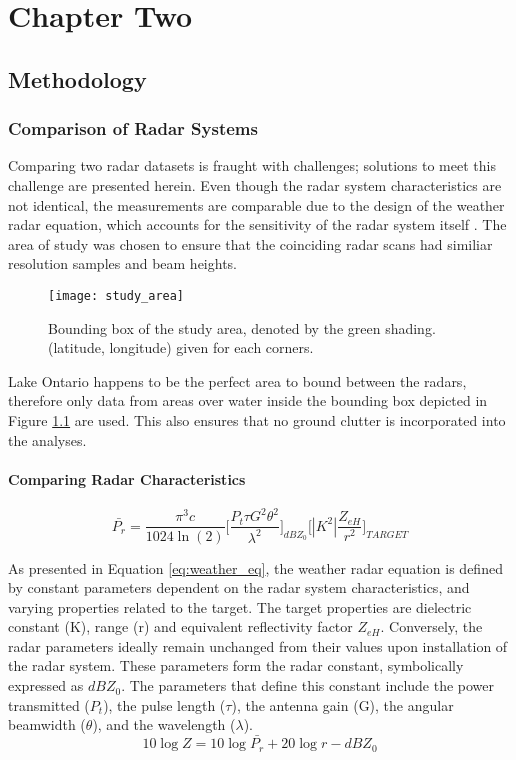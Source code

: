 \chapter{Chapter Two}
\section{Methodology}
\subsection{Comparison of Radar Systems}
Comparing two radar datasets is fraught with challenges; solutions to meet this challenge are presented herein. Even though the radar system characteristics are not identical, the measurements are comparable due to the design of the weather radar equation, which accounts for the sensitivity of the radar system itself \citep{Rogers1989}. The area of study was chosen to ensure that the coinciding radar scans had similiar resolution samples and beam heights. 
\begin{figure}[h]
\texttt{[image: study\_area]}\centering
\caption{Bounding box of the study area, denoted by the green shading. (latitude, longitude) given for each corners.} 
\label{fig:study_area}
\end{figure}
Lake Ontario happens to be the perfect area to bound between the radars, therefore only data from areas over water inside the bounding box depicted in Figure \ref{fig:study_area} are used. This also ensures that no ground clutter is incorporated into the analyses.
\subsubsection{Comparing Radar Characteristics}



\begin{equation}\label{eq:weather_eq}
\bar{P_r} = \frac{\pi^3c}{1024 \ln(2)} \Bigg[\frac{P_t \tau G^2 \theta^2}{\lambda^2}\Bigg]_{dBZ_0} \Bigg[|K^2|\frac{Z_{eH}}{r^2}\Bigg]_{TARGET}
\end{equation}

As presented in Equation \ref{eq:weather_eq}, the weather radar equation is defined by constant parameters dependent on the radar system characteristics, and varying properties related to the target. The target properties are dielectric constant (K), range (r) and equivalent reflectivity factor $Z_{eH}$. Conversely, the radar parameters ideally remain unchanged from their values upon installation of the radar system. These parameters form the radar constant, symbolically expressed as $dBZ_0$. The parameters that define this constant include the power transmitted ($P_t$), the pulse length ($\tau$), the antenna gain (G), the angular beamwidth ($\theta$), and the wavelength ($\lambda$).
\begin{equation}\label{eq:radpow}
10 \log Z = 10 \log{\bar{P_r}} + 20 \log r - dBZ_0
\end{equation}


